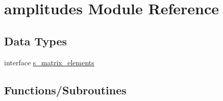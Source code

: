 \hypertarget{namespaceamplitudes}{}\section{amplitudes Module Reference}
\label{namespaceamplitudes}
\subsection*{Data Types}
\begin{DoxyCompactItemize}
\item 
interface \hyperlink{interfaceamplitudes_1_1s__matrix__elements}{s\+\_\+matrix\+\_\+elements}
\end{DoxyCompactItemize}
\subsection*{Functions/\+Subroutines}
